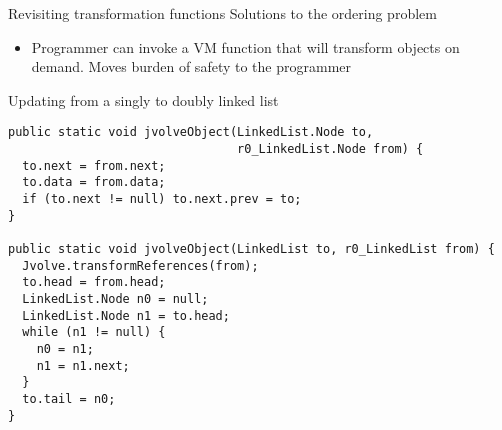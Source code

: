 \begin{frame}[t,fragile]{Revisiting transformation functions}%
Solutions to the ordering problem \\
\begin{itemize}
\item Programmer can invoke a VM function that will transform objects on
demand. Moves burden of safety to the programmer
\end{itemize}
\end{frame}

\begin{frame}[fragile]{Updating from a singly to doubly linked list}%
\begin{footnotesize}
\begin{verbatim}
public static void jvolveObject(LinkedList.Node to,
                                r0_LinkedList.Node from) {
  to.next = from.next;
  to.data = from.data;
  if (to.next != null) to.next.prev = to;
}

public static void jvolveObject(LinkedList to, r0_LinkedList from) {
  Jvolve.transformReferences(from);
  to.head = from.head;
  LinkedList.Node n0 = null;
  LinkedList.Node n1 = to.head;
  while (n1 != null) {
    n0 = n1;
    n1 = n1.next;
  }
  to.tail = n0;
}
\end{verbatim}
\end{footnotesize}
\end{frame}
